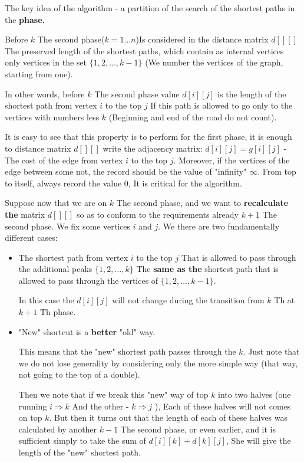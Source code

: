 The key idea of the algorithm - a partition of the search of the shortest paths in the \textbf{phase.}

Before $k$ The second phase($k = 1 \ldots n$)Is considered in the distance matrix $d [][]$ The preserved length of the shortest paths, which contain as internal vertices only vertices in the set $\{1, 2, \ldots, k-1 \}$ (We number the vertices of the graph, starting from one).

In other words, before $k$ The second phase value $d [i][j]$ is the length of the shortest path from vertex $i$ to the top $j$ If this path is allowed to go only to the vertices with numbers less $k$ (Beginning and end of the road do not count).

It is easy to see that this property is to perform for the first phase, it is enough to distance matrix $d [][]$ write the adjacency matrix: $d [i][j] = g [i][j]$ - The cost of the edge from vertex $i$ to the top $j$. Moreover, if the vertices of the edge between some not, the record should be the value of "infinity" $\infty$. From top to itself, always record the value $0$, It is critical for the algorithm.

Suppose now that we are on $k$ The second phase, and we want to \textbf{recalculate the} matrix $d [][]$ so as to conform to the requirements already $k +1$ The second phase. We fix some vertices $i$ and $j$. We there are two fundamentally different cases:

\begin{itemize}

\item The shortest path from vertex $i$ to the top $j$ That is allowed to pass through the additional peaks $\{1, 2, \ldots, k \}$ The \textbf{same as the} shortest path that is allowed to pass through the vertices of $\{1, 2, \ldots, k-1 \}$.

In this case the $d [i][j]$ will not change during the transition from $k$ Th at $k +1$ Th phase.

\item "New" shortcut is a \textbf{better} "old" way.

This means that the "new" shortest path passes through the $k$. Just note that we do not lose generality by considering only the more simple way (that way, not going to the top of a double).

Then we note that if we break this "new" way of top $k$ into two halves (one running $i \Rightarrow k$ And the other - $k \Rightarrow j$ ), Each of these halves will not comes on top $k$. But then it turns out that the length of each of these halves was calculated by another $k-1$ The second phase, or even earlier, and it is sufficient simply to take the sum of $d [i][k] + d [k][j]$, She will give the length of the "new" shortest path.

\end{itemize}

